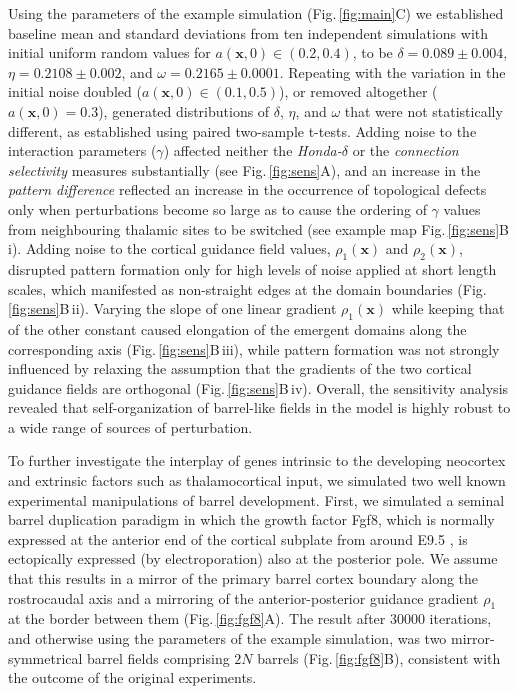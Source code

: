 \documentclass[9pt,lineno]{elife}
\newcommand{\MPthreeSens}[1]{\textcolor{colmpthreesens}{#1}}
\newcommand{\MPthreePred}[1]{\textcolor{colmpthreepred}{#1}}
\newcommand{\mb}[1]{\mathbf{#1}}
\begin{document}
\MPthreeSens{Using the parameters of the example simulation
  (Fig.\,\ref{fig:main}C) we established baseline mean and standard deviations
  from ten independent simulations with initial uniform random values for
  $a(\mb{x},0)\in(0.2,0.4)$, to be $\delta=0.089\pm 0.004$, $\eta=0.2108\pm
  0.002$, and $\omega=0.2165\pm 0.0001$. Repeating with the variation in the
  initial noise doubled ($a(\mb{x},0)\in(0.1,0.5)$), or removed altogether
  ($a(\mb{x},0)=0.3$), generated distributions of $\delta$, $\eta$, and
  $\omega$ that were not statistically different, as established using paired
  two-sample t-tests. Adding noise to the interaction parameters ($\gamma$)
  affected neither the \emph{Honda-}$\delta$ or the \emph{connection
    selectivity} measures substantially (see Fig.\,\ref{fig:sens}A), and an
  increase in the \emph{pattern difference} reflected an increase in the
  occurrence of topological defects only when perturbations become so large as
  to cause the ordering of $\gamma$ values from neighbouring thalamic sites to
  be switched (see example map Fig.\,\ref{fig:sens}B\,i). Adding noise to the
  cortical guidance field values, $\rho_1(\mathbf{x})$ and
  $\rho_2(\mathbf{x})$, disrupted pattern formation only for high levels of
  noise applied at short length scales, which manifested as non-straight edges
  at the domain boundaries (Fig.\,\ref{fig:sens}B\,ii). Varying the slope of one
  linear gradient $\rho_1(\mathbf{x})$ while keeping that of the other
  constant caused elongation of the emergent domains along the corresponding
  axis (Fig.\,\ref{fig:sens}B\,iii), while pattern formation was not strongly
  influenced by relaxing the assumption that the gradients of the two cortical
  guidance fields are orthogonal (Fig.\,\ref{fig:sens}B\,iv). Overall, the
  sensitivity analysis revealed that self-organization of barrel-like fields
  in the model is highly robust to a wide range of sources of perturbation.}

\MPthreePred{To further investigate the interplay of genes intrinsic to the
  developing neocortex and extrinsic factors such as thalamocortical input,
  we simulated two well known experimental manipulations of barrel
  development. First, we simulated a seminal barrel duplication paradigm}
\citep{shimogori_fibroblast_2005,assimacopoulos_fibroblast_2012}
\MPthreePred{in which the growth factor Fgf8, which is normally expressed at
  the anterior end of the cortical subplate from around E9.5}
\citep{crossley_mouse_1995}, \MPthreePred{is ectopically expressed (by
  electroporation) also at the posterior pole. We assume that this results in
  a mirror of the primary barrel cortex boundary along the rostrocaudal axis}
\citep{assimacopoulos_fibroblast_2012} \MPthreePred{and a mirroring of the
  anterior-posterior guidance gradient $\rho_1$ at the border between them
  (Fig.\,\ref{fig:fgf8}A). The result after 30000 iterations, and otherwise
  using the parameters of the example simulation, was two mirror-symmetrical
  barrel fields comprising $2N$ barrels (Fig.\,\ref{fig:fgf8}B), consistent
  with the outcome of the original experiments.}
\end{document}
